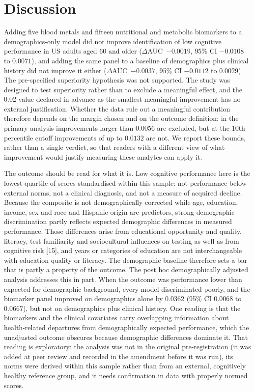 \documentclass[12pt]{article}
\newcommand{\deltaauc}{$\Delta$AUC}
\begin{document}
\section*{Discussion}

Adding five blood metals and fifteen nutritional and metabolic biomarkers to a demographics-only model did not improve identification of low cognitive performance in US adults aged 60 and older (\deltaauc\ $-0.0019$, 95\% CI $-0.0108$ to $0.0071$), and adding the same panel to a baseline of demographics plus clinical history did not improve it either (\deltaauc\ $-0.0037$, 95\% CI $-0.0112$ to $0.0029$). The pre-specified superiority hypothesis was not supported. The study was designed to test superiority rather than to exclude a meaningful effect, and the 0.02 value declared in advance as the smallest meaningful improvement has no external justification. Whether the data rule out a meaningful contribution therefore depends on the margin chosen and on the outcome definition: in the primary analysis improvements larger than $0.0056$ are excluded, but at the 10th-percentile cutoff improvements of up to $0.0132$ are not. We report these bounds, rather than a single verdict, so that readers with a different view of what improvement would justify measuring these analytes can apply it.

The outcome should be read for what it is. Low cognitive performance here is the lowest quartile of scores standardised within this sample: not performance below external norms, not a clinical diagnosis, and not a measure of acquired decline. Because the composite is not demographically corrected while age, education, income, sex and race and Hispanic origin are predictors, strong demographic discrimination partly reflects expected demographic differences in measured performance. Those differences arise from educational opportunity and quality, literacy, test familiarity and sociocultural influences on testing as well as from cognitive risk [15], and years or categories of education are not interchangeable with education quality or literacy. The demographic baseline therefore sets a bar that is partly a property of the outcome. The post hoc demographically adjusted analysis addresses this in part. When the outcome was performance lower than expected for demographic background, every model discriminated poorly, and the biomarker panel improved on demographics alone by $0.0362$ (95\% CI $0.0068$ to $0.0667$), but not on demographics plus clinical history. One reading is that the biomarkers and the clinical covariates carry overlapping information about health-related departures from demographically expected performance, which the unadjusted outcome obscures because demographic differences dominate it. That reading is exploratory: the analysis was not in the original pre-registration (it was added at peer review and recorded in the amendment before it was run), its norms were derived within this sample rather than from an external, cognitively healthy reference group, and it needs confirmation in data with properly normed scores.
\end{document}
